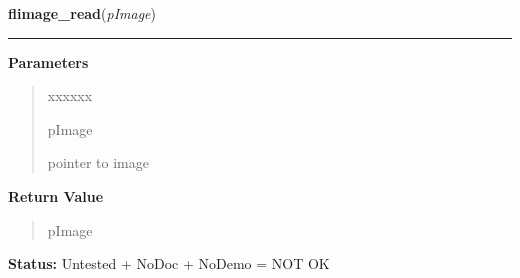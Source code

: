 \hspace{.8\funcindent}\begin{boxedminipage}{\funcwidth}

    \raggedright \textbf{flimage\_read}(\textit{pImage})

    \vspace{-1.5ex}

    \rule{\textwidth}{0.5\fboxrule}
\setlength{\parskip}{2ex}
\setlength{\parskip}{1ex}
      \textbf{Parameters}
      \vspace{-1ex}

      \begin{quote}
        \begin{Ventry}{xxxxxx}

          \item[pImage]

          pointer to image

        \end{Ventry}

      \end{quote}

      \textbf{Return Value}
    \vspace{-1ex}

      \begin{quote}
      pImage

      \end{quote}

\textbf{Status:} Untested + NoDoc + NoDemo = NOT OK



    \end{boxedminipage}

    \label{xformslib:library:flimage_dump}

    \vspace{0.5ex}

